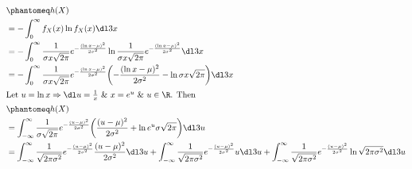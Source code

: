 \documentclass[
  coursecode={MTHE 474},
  assignmentname={Homework \homeworknumber},
  studentnumber=20053722,
  name={Bryan Hoang},
  draft,
]{
  ltxanswer%
}
\begin{document}
  \begin{questions}
    \setcounter{question}{\questionnumber}
    \addtocounter{question}{-1}
    \question[10]\
    \begin{parts}
      \part{}
      \begin{solution}
        \begin{align*}
                       &\phantomeq h(X)                                                                                                                                                                      \\
                       &= -\int_{0}^{\infty} f_{X}(x)\ln f_{X}(x) \dl3x                                                                                                                                      \\
                       &= -\int_{0}^{\infty} \frac{1}{\sigma x \sqrt{2\pi}} e^{-\frac{(\ln x - \mu)^{2}}{2\sigma^{2}}} \ln \frac{1}{\sigma x \sqrt{2\pi}} e^{-\frac{(\ln x - \mu)^{2}}{2\sigma^{2}}} \dl3x   \\
                       &= -\int_{0}^{\infty} \frac{1}{\sigma x \sqrt{2\pi}} e^{-\frac{(\ln x - \mu)^{2}}{2\sigma^{2}}} \biggl(-\frac{(\ln x - \mu)^{2}}{2\sigma^{2}} - \ln \sigma x \sqrt{2\pi}\biggr) \dl3x \\
          \intertext{Let \(u=\ln x \Rightarrow \dl u=\frac{1}{x}\ \&\ x=e^{u}\ \&\ u\in\R\). Then}
                       &\phantomeq h(X)                                                                                                                                                                      \\
                       &= \int_{-\infty}^{\infty} \frac{1}{\sigma \sqrt{2\pi}} e^{-\frac{(u - \mu)^{2}}{2\sigma^{2}}} \biggl(\frac{(u - \mu)^{2}}{2\sigma^{2}} + \ln e^{u}\sigma\sqrt{2\pi}\biggr) \dl3u     \\
                       &= \int_{-\infty}^{\infty} \frac{1}{\sqrt{2\pi\sigma^{2}}} e^{-\frac{(u - \mu)^{2}}{2\sigma^{2}}} \frac{(u - \mu)^{2}}{2\sigma^{2}} \dl3u
          + \int_{-\infty}^{\infty} \frac{1}{\sqrt{2\pi\sigma^{2}}} e^{-\frac{(u - \mu)^{2}}{2\sigma^{2}}} u \dl3u
          + \int_{-\infty}^{\infty} \frac{1}{\sqrt{2\pi\sigma^{2}}} e^{-\frac{(u - \mu)^{2}}{2\sigma^{2}}} \ln\sqrt{2\pi\sigma^{2}} \dl3u                                                                    \\

\end{align*}
\end{solution}
\end{parts}
\end{questions}
\end{document}
